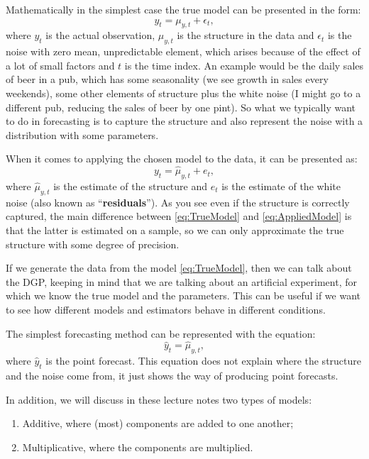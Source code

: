 \documentclass[
]{book}
\providecommand{\tightlist}{%
  \setlength{\itemsep}{0pt}\setlength{\parskip}{0pt}}
\theoremstyle{definition}
\theoremstyle{definition}
\theoremstyle{definition}
\theoremstyle{definition}
\theoremstyle{remark}
\begin{document}
Mathematically in the simplest case the true model can be presented in the form:
\begin{equation}
    y_t = \mu_{y,t} + \epsilon_t,
    \label{eq:TrueModel}
\end{equation}
where \(y_t\) is the actual observation, \(\mu_{y,t}\) is the structure in the data and \(\epsilon_t\) is the noise with zero mean, unpredictable element, which arises because of the effect of a lot of small factors and \(t\) is the time index. An example would be the daily sales of beer in a pub, which has some seasonality (we see growth in sales every weekends), some other elements of structure plus the white noise (I might go to a different pub, reducing the sales of beer by one pint). So what we typically want to do in forecasting is to capture the structure and also represent the noise with a distribution with some parameters.

When it comes to applying the chosen model to the data, it can be presented as:
\begin{equation}
    y_t = \hat{\mu}_{y,t} + e_t,
    \label{eq:AppliedModel}
\end{equation}
where \(\hat{\mu}_{y,t}\) is the estimate of the structure and \(e_t\) is the estimate of the white noise (also known as ``\textbf{residuals}''). As you see even if the structure is correctly captured, the main difference between \eqref{eq:TrueModel} and \eqref{eq:AppliedModel} is that the latter is estimated on a sample, so we can only approximate the true structure with some degree of precision.

If we generate the data from the model \eqref{eq:TrueModel}, then we can talk about the DGP, keeping in mind that we are talking about an artificial experiment, for which we know the true model and the parameters. This can be useful if we want to see how different models and estimators behave in different conditions.

The simplest forecasting method can be represented with the equation:
\begin{equation}
    \hat{y}_t = \hat{\mu}_{y,t},
    \label{eq:Method}
\end{equation}
where \(\hat{y}_t\) is the point forecast. This equation does not explain where the structure and the noise come from, it just shows the way of producing point forecasts.

In addition, we will discuss in these lecture notes two types of models:

\begin{enumerate}
\def\labelenumi{\arabic{enumi}.}
\tightlist
\item
  Additive, where (most) components are added to one another;
\item
  Multiplicative, where the components are multiplied.
\end{enumerate}
\end{document}
